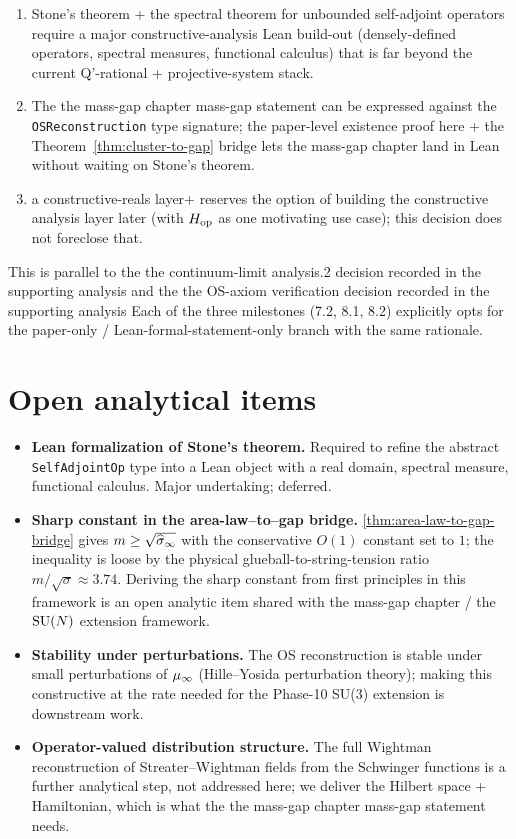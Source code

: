 \begin{enumerate}
  \item Stone's theorem + the spectral theorem for unbounded
    self-adjoint operators require a major constructive-analysis
    Lean build-out (densely-defined operators, spectral measures,
    functional calculus) that is far beyond the current Q'-rational
    + projective-system stack.
  \item The the mass-gap chapter mass-gap statement can be expressed against the
    \texttt{OSReconstruction} type signature; the paper-level
    existence proof here + the Theorem~\ref{thm:cluster-to-gap}
    bridge lets the mass-gap chapter land in Lean without waiting on Stone's
    theorem.
  \item a constructive-reals layer+ reserves the option of building the
    constructive analysis layer later (with $H_{\mathrm{op}}$ as one motivating
    use case); this decision does not foreclose that.
\end{enumerate}

This is parallel to the the continuum-limit analysis.2 decision recorded in
the supporting analysis and the the OS-axiom verification decision
recorded in the supporting analysis  Each of
the three milestones (7.2, 8.1, 8.2) explicitly opts for the
paper-only / Lean-formal-statement-only branch with the same
rationale.

\section{Open analytical items}
\label{sec:open}

\begin{itemize}
  \item \textbf{Lean formalization of Stone's theorem.}  Required
    to refine the abstract \texttt{SelfAdjointOp} type into a Lean
    object with a real domain, spectral measure, functional
    calculus.  Major undertaking; deferred.
  \item \textbf{Sharp constant in the area-law--to--gap bridge.}
    \cref{thm:area-law-to-gap-bridge} gives $m \ge \sqrt{\widehat{\sigma}_\infty}$
    with the conservative $O(1)$ constant set to $1$; the inequality
    is loose by the physical glueball-to-string-tension ratio
    $m/\sqrt{\sigma} \approx 3.74$.  Deriving the sharp constant from
    first principles in this framework is an open analytic item shared
    with the mass-gap chapter / the $\mathrm{SU}(N)$ extension framework.
  \item \textbf{Stability under perturbations.}  The OS reconstruction
    is stable under small perturbations of $\mu_\infty$ (Hille--Yosida
    perturbation theory); making this constructive at the rate
    needed for the Phase-10 SU(3) extension is downstream work.
  \item \textbf{Operator-valued distribution structure.}  The full
    Wightman reconstruction of Streater--Wightman fields from the
    Schwinger functions is a further analytical step, not addressed
    here; we deliver the Hilbert space + Hamiltonian, which is what
    the the mass-gap chapter mass-gap statement needs.
\end{itemize}

